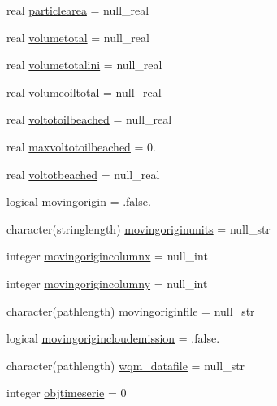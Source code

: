 \begin{DoxyCompactItemize}
real \mbox{\hyperlink{structmodulelagrangianglobal_1_1t__origin_a357d39a8f16486b5d70717a8f4ed4e33}{particlearea}} = null\+\_\+real
\item 
real \mbox{\hyperlink{structmodulelagrangianglobal_1_1t__origin_a1f38bd9cbdab817676a2ab2e7d6d7d8d}{volumetotal}} = null\+\_\+real
\item 
real \mbox{\hyperlink{structmodulelagrangianglobal_1_1t__origin_a76a2ee343a1e20c9146d4e09f33b509a}{volumetotalini}} = null\+\_\+real
\item 
real \mbox{\hyperlink{structmodulelagrangianglobal_1_1t__origin_aaa60ff1c51fa0e87962eb2f4ac30453e}{volumeoiltotal}} = null\+\_\+real
\item 
real \mbox{\hyperlink{structmodulelagrangianglobal_1_1t__origin_ab795e13d1c9027d0eb1c3c75382baf65}{voltotoilbeached}} = null\+\_\+real
\item 
real \mbox{\hyperlink{structmodulelagrangianglobal_1_1t__origin_a72844bcd4cae3f9ecd23ffa306c70f54}{maxvoltotoilbeached}} = 0.
\item 
real \mbox{\hyperlink{structmodulelagrangianglobal_1_1t__origin_a4774d7ebbd162373114d81c02807858a}{voltotbeached}} = null\+\_\+real
\item 
logical \mbox{\hyperlink{structmodulelagrangianglobal_1_1t__origin_ac3d4784c59f94497486700f0d66ac3cb}{movingorigin}} = .false.
\item 
character(stringlength) \mbox{\hyperlink{structmodulelagrangianglobal_1_1t__origin_a0c21b92c0b2bb890e2d41d4254659dcc}{movingoriginunits}} = null\+\_\+str
\item 
integer \mbox{\hyperlink{structmodulelagrangianglobal_1_1t__origin_a26d451185dc2d7b1dd1f984ad610a517}{movingorigincolumnx}} = null\+\_\+int
\item 
integer \mbox{\hyperlink{structmodulelagrangianglobal_1_1t__origin_a3ba13748ec0b8f7244932c6bfc05f57f}{movingorigincolumny}} = null\+\_\+int
\item 
character(pathlength) \mbox{\hyperlink{structmodulelagrangianglobal_1_1t__origin_a09669c031e3bc8c6e395aa429277ac89}{movingoriginfile}} = null\+\_\+str
\item 
logical \mbox{\hyperlink{structmodulelagrangianglobal_1_1t__origin_a7870d5ac0bc6b04554a732c8cac70395}{movingorigincloudemission}} = .false.
\item 
character(pathlength) \mbox{\hyperlink{structmodulelagrangianglobal_1_1t__origin_af41612ba65e879170db51bfdd4b216aa}{wqm\+\_\+datafile}} = null\+\_\+str
\item 
integer \mbox{\hyperlink{structmodulelagrangianglobal_1_1t__origin_a1163d191537fac30e7715d60dbd70e50}{objtimeserie}} = 0

\end{DoxyCompactItemize}
